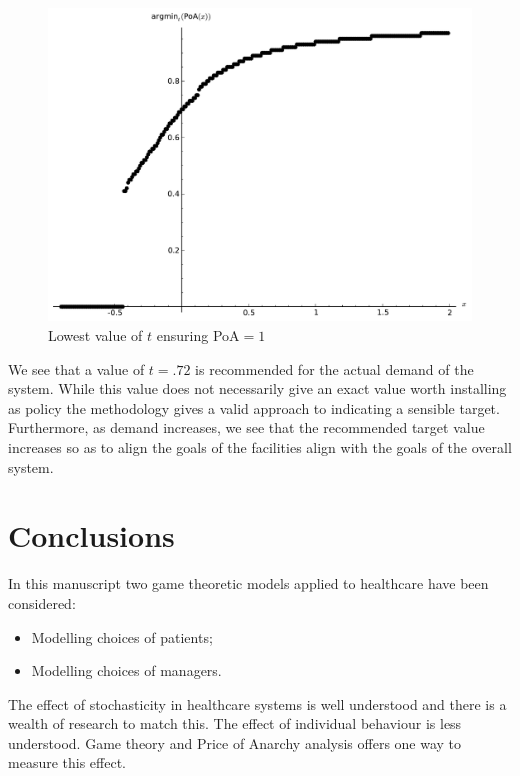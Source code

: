 \documentclass[a4paper,11pt]{article}
\begin{document}
\begin{figure}[!htbp]
\begin{center}
\includegraphics[width=12cm]{./Images/argminPoAmodel2.pdf}
\caption{Lowest value of $t$ ensuring PoA$=1$} \label{mintargetvdemandmodel2}
\end{center}
\end{figure}

We see that a value of $t=.72$ is recommended for the actual demand of the system.
While this value does not necessarily give an exact value worth installing as policy the methodology gives a valid approach to indicating a sensible target.
Furthermore, as demand increases, we see that the recommended target value increases so as to align the goals of the facilities align with the goals of the overall system.

\section{Conclusions}\label{sec:conclusion}

In this manuscript two game theoretic models applied to healthcare have been considered:

\begin{itemize}
    \item Modelling choices of patients;
    \item Modelling choices of managers.
\end{itemize}

The effect of stochasticity in healthcare systems is well understood and there is a wealth of research to match this.
The effect of individual behaviour is less understood.
Game theory and Price of Anarchy analysis offers one way to measure this effect.
\end{document}
